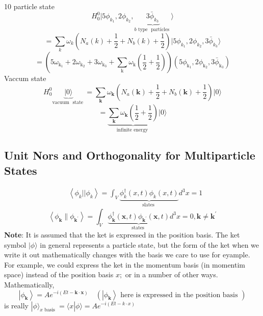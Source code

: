 \begin{example}
10 particle state
$$
H_{0}^{0}|5\phi_{k_{1}},2 \phi_{k_{2}},\underbrace{3 \bar{\phi}_{k_{3}}}_{b \text { type } \text { particles }}\rangle$$
$$=\sum_{k} \omega_{k}\left(N_{a}(k)+\frac{1}{2}+N_{b}(k)+\frac{1}{2}\right)| 5 \phi_{k_{1}}, 2 \phi_{k_{2}}, 3 \bar{\phi}_{k_{3}}\rangle
$$
$$
=\left(5 \omega_{\mathrm{k}_{1}}+2 \omega_{\mathrm{k}_{2}}+3 \omega_{\mathrm{k}_{3}}+\sum_{\mathrm{k}} \omega_{\mathrm{k}}\left(\frac{1}{2}+\frac{1}{2}\right)\right)\left(5 \phi_{\mathrm{k}_{1}}, 2 \phi_{\mathrm{k}_{2}}, 3 \bar{\phi}_{\mathrm{k}_{3}}\right)
$$
Vaccum state
$$
H_{0}^{0} \underbrace{| 0\rangle}_{\text {vacuum } \text { state }}=\sum_{\mathbf{k}} \omega_{\mathbf{k}}\left(N_{a}(\mathbf{k})+\frac{1}{2}+N_{b}(\mathbf{k})+\frac{1}{2}\right)|0\rangle
$$
$$
=
\underbrace{\sum_{\mathbf{k}} \omega_{\mathbf{k}}\left(\frac{1}{2}+\frac{1}{2}\right)}_{\text {infinite energy }}|0\rangle
$$
\end{example}
\subsection{Unit Nors and Orthogonality for Multiparticle States}
\begin{equation}
\begin{aligned}
&\left\langle\phi_{k}|| \phi_{k}\right\rangle=\int_{V} \underbrace{\phi_{k}^{\dagger}(x, t) \phi_{k}(x, t)}_{\text {slates }} d^{3} x=1
\end{aligned}
\end{equation}
\begin{equation}
\left\langle\phi_{\mathbf{k}} \| \phi_{\mathbf{k}^{\prime}}\right\rangle=\int_{V} \underbrace{\phi_{\mathbf{k}}^{\dagger}(\mathbf{x}, t) \phi_{\mathbf{k}^{\prime}}(\mathbf{x}, t)}_{\text {states }} d^{3} x=0, \mathbf{k} \neq \mathbf{k}^{\prime}
\end{equation}
\textbf{Note}: It is assumed that the ket is expressed in the position basis. The ket symbol $|\phi\rangle$ in general represents a particle state, but the form of the ket when we write it out mathematically changes with the basis we care to use for eyample. For example, we could express the ket in the momentum basis (in momentim space) instead of the position basis $x ;$ or in a number of other ways. Mathematically, 
$$
\left|\phi_{\mathbf{k}}\right\rangle= A e^{-i(E t-\mathbf{k} \cdot \mathbf{x})} \quad\left(\left|\phi_{\mathbf{k}}\right\rangle \text { here is expressed in the position basis }\right)
$$
is really $|\phi\rangle_{x \text { basis }}=\langle x | \phi\rangle= A e^{-i(E t-k \cdot x)}$


